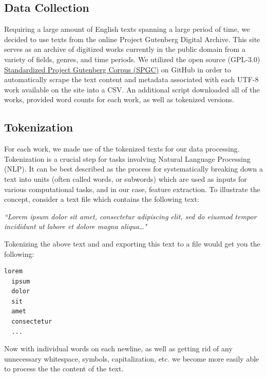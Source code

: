 \documentclass{article}
\begin{document}
\subsection{Data Collection}

Requiring a large amount of English texts spanning a large period of time, 
  we decided to use texts from the online Project Gutenberg Digital Archive. 
  This site serves as an archive of digitized works currently in the public
  domain from a variety of fields, genres, and time periods. We utilized the
  open source (GPL-3.0) \href{https://github.com/pgcorpus/gutenberg}{Standardized 
  Project Gutenberg Corpus (SPGC)} on GitHub in order to automatically scrape the 
  text content and metadata associated with each UTF-8 work available on the site 
  into a CSV. An additional script downloaded all of the works, provided word 
  counts for each work, as well as tokenized versions.

\subsection{Tokenization}

For each work, we made use of the tokenized texts for our data 
  processing. Tokenization is a crucial step for tasks involving Natural Language 
  Processing (NLP). It can be best described as the process for systematically breaking 
  down a text into units (often called words, or subwords) which are used as inputs for 
  various computational tasks, and in our case, feature extraction. To illustrate the 
  concept, consider a text file which contains the following text:

    \hspace{0.5cm} \hangindent=0.65cm \textit{``Lorem ipsum dolor sit amet, consectetur adipiscing}
    \hspace{0.5cm} \textit{elit, sed do eiusmod tempor incididunt ut labore et dolore magna aliqua\dots"}

  Tokenizing the above text and and exporting this text to a file would get you the following:
    \lstset{style=mystyle}
    \hspace{0.5cm} \begin{lstlisting}[language=Python, caption=Tokenization Example]
  lorem 
  ipsum 
  dolor 
  sit 
  amet
  consectetur
  ...
      \end{lstlisting}

Now with individual words on each newline, as well as getting rid of any unnecessary whitespace, 
  symbols, capitalization, etc. we become more easily able to process the the content of the text.
\end{document}
